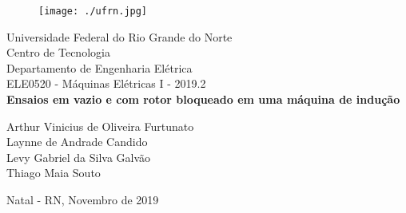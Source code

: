 \onehalfspacing
\begin{titlepage}
	\begin{center}
	
	\begin{figure}[!ht]
	\centering
	\texttt{[image: ./ufrn.jpg]}
	\end{figure}
		Universidade Federal do Rio Grande do Norte \\ Centro de Tecnologia \\ Departamento de Engenharia Elétrica \\ ELE0520 - Máquinas Elétricas I - 2019.2 \\
		\vspace{15pt}
        \vspace{95pt}
        \textbf{\Large{Ensaios em vazio e com rotor bloqueado em uma máquina de indução}}\\
		\vspace{3,5cm}
	\end{center}
	
	\begin{flushright}
			\item  Arthur Vinicius de Oliveira Furtunato \\ Laynne de Andrade Candido \\ Levy Gabriel da Silva Galvão \\ Thiago Maia Souto
 	\end{flushright}
	\vspace{1cm}
	
	\begin{center}
		\vspace{\fill}
		Natal - RN, Novembro de 2019
	\end{center}
\end{titlepage}




